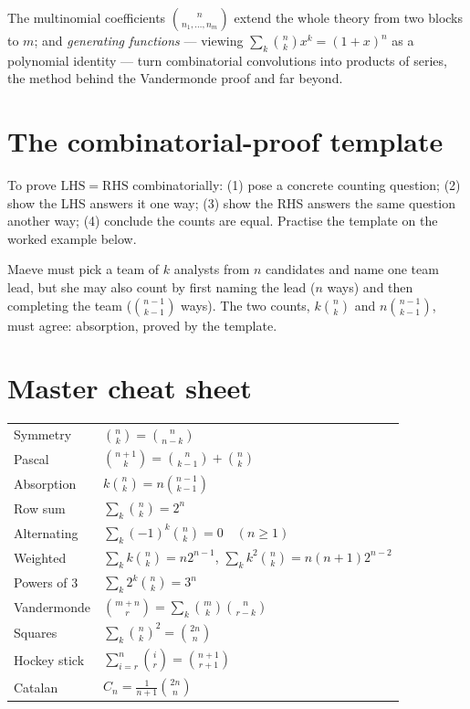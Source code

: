 The multinomial coefficients $\binom{n}{n_1,\dots,n_m}$ extend the whole
theory from two blocks to $m$; and \emph{generating functions} --- viewing
$\sum_k \binom{n}{k}x^k = (1+x)^n$ as a polynomial identity --- turn
combinatorial convolutions into products of series, the method behind the
Vandermonde proof and far beyond.

\section{The combinatorial-proof template}

To prove $\mathrm{LHS} = \mathrm{RHS}$ combinatorially: (1) pose a concrete
counting question; (2) show the LHS answers it one way; (3) show the RHS
answers the same question another way; (4) conclude the counts are equal.
Practise the template on the worked example below.

\begin{example}
Maeve must pick a team of $k$ analysts from $n$ candidates and name one team
lead, but she may also count by first naming the lead ($n$ ways) and then
completing the team ($\binom{n-1}{k-1}$ ways). The two counts,
$k\binom{n}{k}$ and $n\binom{n-1}{k-1}$, must agree: absorption, proved by
the template.
\end{example}

\section{Master cheat sheet}

\begin{center}
\renewcommand{\arraystretch}{1.6}
\begin{tabular}{ll}
\toprule
Symmetry & $\binom{n}{k} = \binom{n}{n-k}$\\
Pascal & $\binom{n+1}{k} = \binom{n}{k-1} + \binom{n}{k}$\\
Absorption & $k\binom{n}{k} = n\binom{n-1}{k-1}$\\
Row sum & $\sum_k \binom{n}{k} = 2^{n}$\\
Alternating & $\sum_k (-1)^{k}\binom{n}{k} = 0 \quad (n \geq 1)$\\
Weighted & $\sum_k k\binom{n}{k} = n2^{n-1}$, \quad
  $\sum_k k^{2}\binom{n}{k} = n(n+1)2^{n-2}$\\
Powers of 3 & $\sum_k 2^{k}\binom{n}{k} = 3^{n}$\\
Vandermonde & $\binom{m+n}{r} = \sum_k \binom{m}{k}\binom{n}{r-k}$\\
Squares & $\sum_k \binom{n}{k}^{2} = \binom{2n}{n}$\\
Hockey stick & $\sum_{i=r}^{n} \binom{i}{r} = \binom{n+1}{r+1}$\\
Catalan & $C_n = \frac{1}{n+1}\binom{2n}{n}$\\
\bottomrule
\end{tabular}
\end{center}

